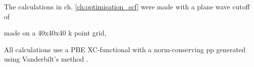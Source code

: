 \documentclass[main.tex]{subfiles}
\begin{document}
The calculations in ch. \ref{ch:optimisation_scf} were made with a plane wave cutoff of

made on a 40x40x40 k point grid, 

All calculations use a PBE XC-functional with a norm-conserving \acrshort{pp} generated using Vanderbilt's method \cite{hamann_erratum_2017}.


\subsection{\TaS}\label{sub:systems_tas2}
\end{document}
